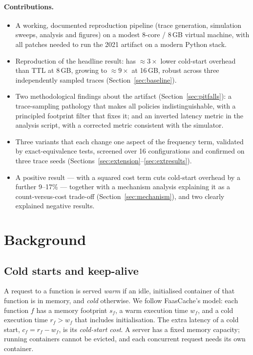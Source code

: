 \documentclass[11pt,a4paper]{article}
\newcommand{\gd}{\text{GD}}
\newcommand{\gdw}{\text{GD-W}}
\begin{document}
\paragraph{Contributions.}
\begin{itemize}
  \item A working, documented reproduction pipeline (trace generation, simulation sweeps,
        analysis and figures) on a modest 8-core / 8\,GB virtual machine, with all patches
        needed to run the 2021 artifact on a modern Python stack.
  \item Reproduction of the headline result: \gd{} has $\approx\!3\times$ lower cold-start
        overhead than TTL at 8\,GB, growing to $\approx\!9\times$ at 16\,GB, robust across
        three independently sampled traces (Section~\ref{sec:baseline}).
  \item Two methodological findings about the artifact (Section~\ref{sec:pitfalls}): a
        trace-sampling pathology that makes all policies indistinguishable, with a principled
        footprint filter that fixes it; and an inverted latency metric in the analysis
        script, with a corrected metric consistent with the simulator.
  \item Three \gd{} variants that each change one aspect of the frequency term, validated by
        exact-equivalence tests, screened over 16 configurations and confirmed on three trace
        seeds (Sections~\ref{sec:extension}--\ref{sec:extresults}).
  \item A positive result --- \gdw{} with a squared cost term cuts cold-start overhead by a
        further 9--17\% --- together with a mechanism analysis explaining it as a
        count-versus-cost trade-off (Section~\ref{sec:mechanism}), and two clearly
        explained negative results.
\end{itemize}

\section{Background}
\label{sec:background}

\subsection{Cold starts and keep-alive}
A request to a function is served \emph{warm} if an idle, initialised container of that
function is in memory, and \emph{cold} otherwise. We follow FaasCache's model: each
function $f$ has a memory footprint $s_f$, a warm execution time $w_f$, and a cold
execution time $r_f > w_f$ that includes initialisation. The extra latency of a cold start,
$c_f = r_f - w_f$, is its \emph{cold-start cost}. A server has a fixed memory capacity;
running containers cannot be evicted, and each concurrent request needs its own container.
\end{document}
